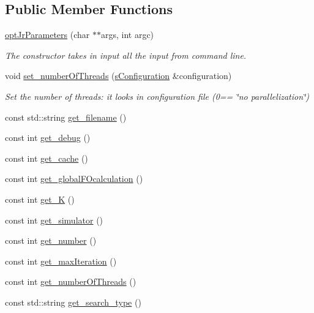 \subsection*{Public Member Functions}
\begin{DoxyCompactItemize}
\item 
\hyperlink{classoptJrParameters_a76f806d48141b4b4c7a215c2645011de}{opt\-Jr\-Parameters} (char $\ast$$\ast$args, int argc)
\begin{DoxyCompactList}\small\item\em The constructor takes in input all the input from command line. \end{DoxyCompactList}\item 
void \hyperlink{classoptJrParameters_a3747d78e5dd35b8b1aa1c037e9d91cf7}{set\-\_\-number\-Of\-Threads} (\hyperlink{readConfigurationFile_8hh_ab8f35b1da3261263c5e9c0e7c8921f5c}{s\-Configuration} \&configuration)
\begin{DoxyCompactList}\small\item\em Set the number of threads\-: it looks in configuration file (0== \char`\"{}no parallelization\char`\"{}) \end{DoxyCompactList}\item 
const std\-::string \hyperlink{classoptJrParameters_a8dcc738e721b3df88c2622712ed83414}{get\-\_\-filename} ()
\item 
const int \hyperlink{classoptJrParameters_a64016f274261a7a7d74d8460bb7e2ee4}{get\-\_\-debug} ()
\item 
const int \hyperlink{classoptJrParameters_ac698812fa1177c71eb46dc61d2e5af77}{get\-\_\-cache} ()
\item 
const int \hyperlink{classoptJrParameters_a7eec5151603fd03276b6fcf6213f9f90}{get\-\_\-global\-F\-Ocalculation} ()
\item 
const int \hyperlink{classoptJrParameters_a8274b4a95698ce1681147fdddbced0d8}{get\-\_\-\-K} ()
\item 
const int \hyperlink{classoptJrParameters_a199e3fc83f3efb82fc63796a540d6589}{get\-\_\-simulator} ()
\item 
const int \hyperlink{classoptJrParameters_a9bb0e783bd6bf555e86cea874f13cb4f}{get\-\_\-number} ()
\item 
const int \hyperlink{classoptJrParameters_a73340961e894748c6c143284e0b278fa}{get\-\_\-max\-Iteration} ()
\item 
const int \hyperlink{classoptJrParameters_a6654c5bb36a825393e759b2824444bbb}{get\-\_\-number\-Of\-Threads} ()
\item 
const std\-::string \hyperlink{classoptJrParameters_ad85aa8c85b78b70e3fad881d6aae0143}{get\-\_\-search\-\_\-type} ()
\end{DoxyCompactItemize}

